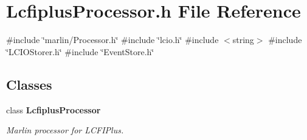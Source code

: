 \section{Lcfiplus\+Processor.\+h File Reference}
\label{LcfiplusProcessor_8h}
{\ttfamily \#include \char`\"{}marlin/\+Processor.\+h\char`\"{}}\newline
{\ttfamily \#include \char`\"{}lcio.\+h\char`\"{}}\newline
{\ttfamily \#include $<$string$>$}\newline
{\ttfamily \#include \char`\"{}L\+C\+I\+O\+Storer.\+h\char`\"{}}\newline
{\ttfamily \#include \char`\"{}Event\+Store.\+h\char`\"{}}\newline
\subsection*{Classes}
\begin{DoxyCompactItemize}
\item 
class \textbf{ Lcfiplus\+Processor}
\begin{DoxyCompactList}\small\item\em Marlin processor for L\+C\+F\+I\+Plus. \end{DoxyCompactList}\end{DoxyCompactItemize}
